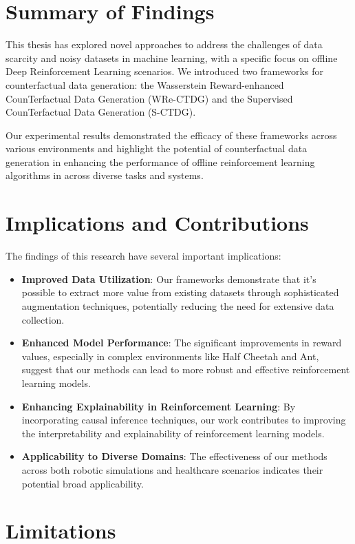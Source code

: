 \section{Summary of Findings}

This thesis has explored novel approaches to address the challenges
of data scarcity and noisy datasets in machine learning, with a specific
focus on offline Deep Reinforcement Learning scenarios.
We introduced two frameworks for counterfactual data generation:
the Wasserstein Reward-enhanced CounTerfactual Data Generation (WRe-CTDG)
and the Supervised CounTerfactual Data Generation (S-CTDG).

Our experimental results demonstrated the efficacy of these
frameworks across various environments and highlight the potential
of counterfactual data generation in enhancing the performance of
offline reinforcement learning algorithms
in across diverse tasks and systems.

\section{Implications and Contributions}

The findings of this research have several important implications:
\begin{itemize}
    \item \textbf{Improved Data Utilization}: Our frameworks demonstrate
    that it's possible to extract more value from existing datasets
    through sophisticated augmentation techniques, potentially 
    reducing the need for extensive data collection.
    \item \textbf{Enhanced Model Performance}: The significant improvements
    in reward values, especially in complex environments
    like Half Cheetah and Ant, suggest that our methods can lead
    to more robust and effective reinforcement learning models.
    \item \textbf{Enhancing Explainability in Reinforcement Learning}: 
    By incorporating causal inference techniques, our work contributes to improving the interpretability and explainability of reinforcement learning models.
    \item \textbf{Applicability to Diverse Domains}: The effectiveness of
    our methods across both robotic simulations and healthcare
    scenarios indicates their potential broad applicability.
\end{itemize}

\section{Limitations}

